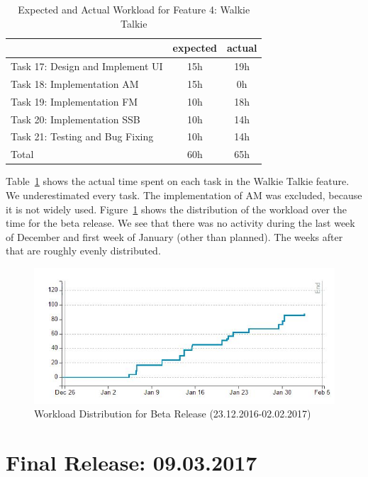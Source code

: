 	\begin{table}
	\centering
	\caption{Expected and Actual Workload for Feature 4: Walkie Talkie}
	\label{tab:alpha:feature4}
	\begin{tabular}{ l | c | c }
		& expected  & actual \\ \hline
		Task 17: Design and Implement UI& 15h & 19h \\ \hline
		Task 18: Implementation AM& 15h & 0h  \\ \hline
		Task 19: Implementation FM& 10h & 18h  \\ \hline
		Task 20: Implementation SSB& 10h & 14h \\ \hline 
		Task 21: Testing and Bug Fixing& 10h & 14h \\ \hline \hline
		Total & 60h & 65h
	\end{tabular}
\end{table}

Table~\ref{tab:alpha:feature4} shows the actual time spent on each task in the Walkie Talkie feature. We underestimated every task. The implementation of AM was excluded, because it is not widely used. 
Figure~\ref{fig:agilefant_beta} shows the distribution of the workload over the time for the beta release. We see that there was no activity during the last week of December and first week of January (other than planned). The weeks after that are roughly evenly distributed. 

\begin{figure}
	\centering
	\includegraphics[width=1\linewidth]{gfx/Agilefant_Beta.jpg}
	\caption{Workload Distribution for Beta Release (23.12.2016-02.02.2017)}
	\label{fig:agilefant_beta}
\end{figure}

\section{Final Release: 09.03.2017}

